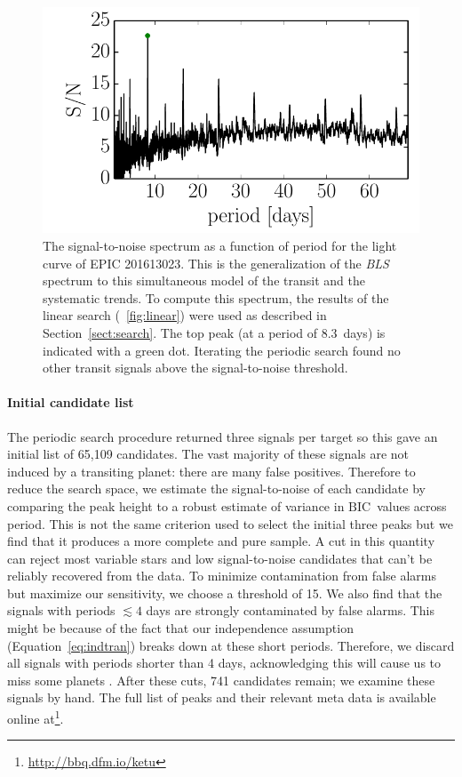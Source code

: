 \documentclass[12pt,preprint]{aastex}
\newcommand{\project}[1]{\textsl{#1}} %
\newcommand{\figref}[1]{\ref{fig:#1}}
\newcommand{\Fig}[1]{\figurename~\figref{#1}}
\newcommand{\fig}[1]{\Fig{#1}}
\newcommand{\figlabel}[1]{\label{fig:#1}}
\newcommand{\eqalt}[1]{Equation~\ref{eq:#1}}
\newcommand{\sectionname}{Section}
\newcommand{\Sect}[1]{\sectionname~\ref{sect:#1}}
\newcommand{\sect}[1]{\Sect{#1}}
\newcommand{\BIC}{{\ensuremath{\mathrm{BIC}}}}
\newcommand{\datareleaseurl}{{\url{http://bbq.dfm.io/ketu}}}
\begin{document}
\begin{figure}[p]
\begin{center}
\includegraphics{figures/periodic.pdf}
\end{center}
\caption{%
The signal-to-noise spectrum as a function of period for the light curve of
EPIC 201613023.
This is the generalization of the \project{BLS} spectrum \citep{Kovacs:2002}
to this simultaneous model of the transit and the systematic trends.
To compute this spectrum, the results of the linear search (\fig{linear})
were used as described in \sect{search}.
The top peak (at a period of 8.3~days) is indicated with a green dot.
Iterating the periodic search found no other transit signals above the
signal-to-noise threshold.
\figlabel{periodic}}
\end{figure}



\paragraph{Initial candidate list}

The periodic search procedure returned three signals per target so this gave
an initial list of 65,109 candidates.
The vast majority of these signals are not induced by a transiting planet:
there are many false positives.
Therefore to reduce the search space, we estimate the signal-to-noise of each
candidate by comparing the peak height to a robust estimate of variance in
\BIC\ values across period.
This is not the same criterion used to select the initial three peaks but we
find that it produces a more complete and pure sample.
A cut in this quantity can reject most variable stars and low signal-to-noise
candidates that can't be reliably recovered from the data.
To minimize contamination from false alarms but maximize our sensitivity, we
choose a threshold of 15.
We also find that the signals with periods $\lesssim 4$ days are strongly
contaminated by false alarms.
This might be because of the fact that our independence assumption
(\eqalt{indtran}) breaks down at these short periods.
Therefore, we discard all signals with periods shorter than 4 days,
acknowledging this will cause us to miss some planets
\citep{Sanchis-Ojeda:2014}.
After these cuts, 741 candidates remain; we examine these signals by hand.
The full list of peaks and their relevant meta data is available online
at\footnote{\datareleaseurl}.
\end{document}
